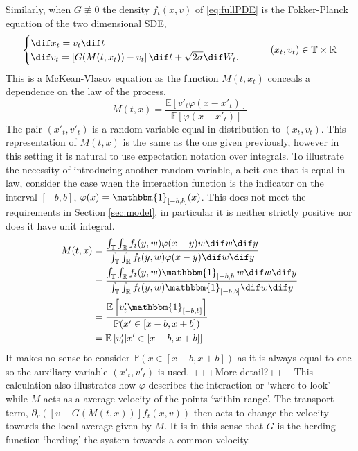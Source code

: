 \documentclass[11pt, a4pape draft]{article}
\renewcommand{\phi}{\varphi}
\renewcommand{\P}{\mathbb{P}}
\newcommand{\E}{\mathbb{E}}
\renewcommand{\R}{\mathbb{R}}
\newcommand{\T}{\mathbb{T}}
\begin{document}
        Similarly, when $G\not\equiv 0$ the density $f_t(x,v)$ of \eqref{eq:fullPDE} is the Fokker-Planck equation of the two dimensional SDE,
		    \begin{equation}\label{eq:McK_V}\begin{cases}
		    \dif x_t = v_t\dif t\\
		    \dif v_t = \left[G(M(t,x_t))-v_t\right] \dif t + \sqrt{2\sigma} \dif W_t. 
			\end{cases} \qquad  (x_t,v_t) \in \T \times \R
			\end{equation}
		This is a McKean-Vlasov equation as the function $M(t,x_t)$ conceals a dependence on the law of the process. 
        \[
            M(t,x) = \frac{\E\left[ v'_t \phi(x-x'_t)\right]}{\E\left[\phi(x-x'_t)\right]}
        \]
        The pair $(x'_t,v'_t)$ is a random variable equal in distribution to $(x_t,v_t)$. This representation of $M(t,x)$ is the same as the one given previously, however in this setting it is natural to use expectation notation over integrals. To illustrate the necessity of introducing another random variable, albeit one that is equal in law, consider the case when the interaction function is the indicator on the interval $[-b,b]$, $\phi(x) = \mathbbm{1}_{[-b,b]}(x)$. This does not meet the requirements in Section \ref{sec:model}, in particular it is neither strictly positive nor does it have unit integral. 
        \begin{align*}
            M(t,x) &=  \frac{\int_{\T}\int_{\R}f_t(y,w)\phi(x-y)w\dif w \dif y}{\int_{\T}\int_{\R}f_t(y,w)\phi(x-y)\dif w \dif y}\\
            &=  \frac{\int_{\T}\int_{\R}f_t(y,w) \mathbbm{1}_{[-b,b]}w\dif w \dif y}{\int_{\T}\int_{\R}f_t(y,w) \mathbbm{1}_{[-b,b]}\dif w \dif y}\\
            &= \frac{\E\left[ v'_t \mathbbm{1}_{[-b,b]}\right]}{\P(x' \in \left[x-b,x+b\right])}\\
            &= \E\left[ v'_t|x' \in [x-b,x+b] \right]
        \end{align*}
        It makes no sense to consider $\P(x \in [x-b,x+b])$ as it is always equal to one so the auxiliary variable $(x'_t,v'_t)$ is used. +++More detail?+++ This calculation also illustrates how $\phi$ describes the interaction or `where to look' while $M$ acts as a average velocity of the points `within range'. The transport term, $\partial_v\left( \left[ v-G(M(t,x))\right]f_t(x,v)\right)$ then acts to change the velocity towards the local average given by $M$. It is in this sense that $G$ is the herding function `herding' the system towards a common velocity.
        
\end{document}
